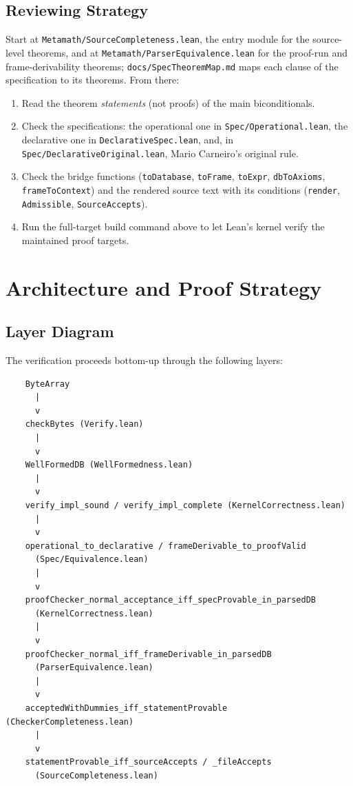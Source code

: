 \documentclass[11pt]{article}
\newcommand{\lean}[1]{\lstinline[language=Lean4]{#1}}
\newcommand{\file}[1]{\texttt{#1}}
\begin{document}
\subsection{Reviewing Strategy}

Start at \file{Metamath/SourceCompleteness.lean}, the entry module for
the source-level theorems, and at \file{Metamath/ParserEquivalence.lean}
for the proof-run and frame-derivability theorems;
\file{docs/SpecTheoremMap.md} maps each clause of the specification to
its theorems.  From there:

\begin{enumerate}[leftmargin=2em]
\item Read the theorem \emph{statements} (not proofs) of the main
  biconditionals.
\item Check the specifications: the operational one in
  \file{Spec/Operational.lean}, the declarative one in
  \file{DeclarativeSpec.lean}, and, in
  \file{Spec/DeclarativeOriginal.lean}, Mario Carneiro's original rule.
\item Check the bridge functions (\lean{toDatabase}, \lean{toFrame},
  \lean{toExpr}, \lean{dbToAxioms}, \lean{frameToContext}) and the
  rendered source text with its conditions (\lean{render},
  \lean{Admissible}, \lean{SourceAccepts}).
\item Run the full-target build command above to let Lean's kernel verify
  the maintained proof targets.
\end{enumerate}

\section{Architecture and Proof Strategy}
\label{sec:architecture}

\subsection{Layer Diagram}

The verification proceeds bottom-up through the following layers:

\begin{verbatim}
    ByteArray
      |
      v
    checkBytes (Verify.lean)
      |
      v
    WellFormedDB (WellFormedness.lean)
      |
      v
    verify_impl_sound / verify_impl_complete (KernelCorrectness.lean)
      |
      v
    operational_to_declarative / frameDerivable_to_proofValid
      (Spec/Equivalence.lean)
      |
      v
    proofChecker_normal_acceptance_iff_specProvable_in_parsedDB
      (KernelCorrectness.lean)
      |
      v
    proofChecker_normal_iff_frameDerivable_in_parsedDB
      (ParserEquivalence.lean)
      |
      v
    acceptedWithDummies_iff_statementProvable (CheckerCompleteness.lean)
      |
      v
    statementProvable_iff_sourceAccepts / _fileAccepts
      (SourceCompleteness.lean)
\end{verbatim}
\end{document}
